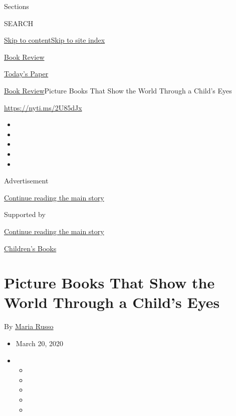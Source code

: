 Sections

SEARCH

\protect\hyperlink{site-content}{Skip to
content}\protect\hyperlink{site-index}{Skip to site index}

\href{https://www.nytimes3xbfgragh.onion/section/books/review}{Book
Review}

\href{https://myaccount.nytimes3xbfgragh.onion/auth/login?response_type=cookie\&client_id=vi}{}

\href{https://www.nytimes3xbfgragh.onion/section/todayspaper}{Today's
Paper}

\href{/section/books/review}{Book Review}\textbar{}Picture Books That
Show the World Through a Child's Eyes

\url{https://nyti.ms/2U85dJx}

\begin{itemize}
\item
\item
\item
\item
\item
\end{itemize}

Advertisement

\protect\hyperlink{after-top}{Continue reading the main story}

Supported by

\protect\hyperlink{after-sponsor}{Continue reading the main story}

\href{/column/childrens-books}{Children's Books}

\hypertarget{picture-books-that-show-the-world-through-a-childs-eyes}{%
\section{Picture Books That Show the World Through a Child's
Eyes}\label{picture-books-that-show-the-world-through-a-childs-eyes}}

By \href{https://www.nytimes3xbfgragh.onion/by/maria-russo}{Maria Russo}

\begin{itemize}
\item
  March 20, 2020
\item
  \begin{itemize}
  \item
  \item
  \item
  \item
  \item
  \end{itemize}
\end{itemize}

